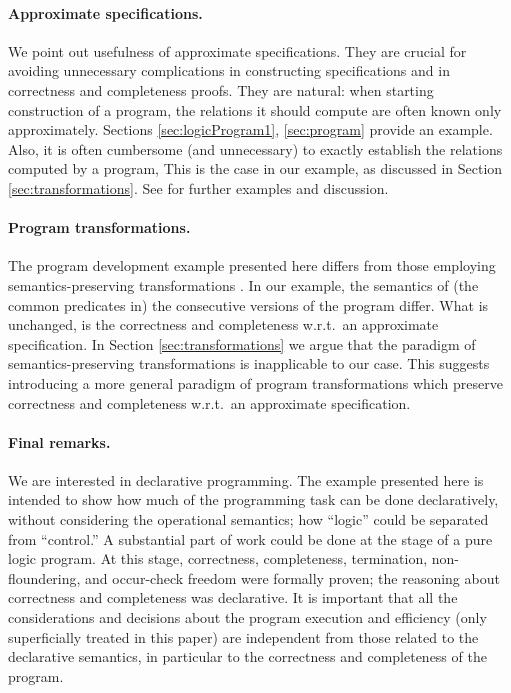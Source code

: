 \documentclass{tlp}
\begin{document}
\paragraph{Approximate specifications.}
  We point out usefulness of approximate specifications.
They are crucial for avoiding unnecessary
  complications in constructing specifications and in
   correctness and completeness proofs.
  They are natural:  when starting construction of a program, 
  the relations it should compute are often known only approximately.
  Sections \ref{sec:logicProgram1}, \ref{sec:program} provide an example.
Also, it is often cumbersome (and unnecessary) to exactly establish the
  relations computed by a program, 
  This is the case in our example, as discussed in Section
  \ref{sec:transformations}. 
  See \cite{drabent.tocl16} for further examples and discussion.
  

\paragraph{Program transformations.}
The program development example presented here differs from those
employing semantics-preserving transformations
\cite[and the references therein]{PettorossiPS10shorter}.
In our example,
  the semantics of (the common predicates in) the consecutive versions 
of the program differ.  What is unchanged, is the correctness
  and completeness w.r.t.\ an approximate specification.
In Section \ref{sec:transformations}
  we argue that the paradigm of semantics-preserving transformations
  is inapplicable to our case.
  This suggests introducing a more general paradigm of program transformations which 
  preserve correctness and completeness w.r.t.\ an approximate specification.




\paragraph{Final remarks.}
We are interested in declarative programming.
The example presented here
  is intended to show how much of the programming task can be
  done declaratively, 
  without considering the operational semantics; how 
   ``logic'' could be separated from ``control.''  A substantial part of work
  could be done at the stage of a pure logic program.
At this stage, correctness, completeness, termination, non-floundering, and
  occur-check freedom were formally proven;
the reasoning about correctness and completeness was declarative.
  It is important that all the
  considerations and decisions about the program execution and efficiency
  (only superficially treated in this paper) are independent from those related
  to the declarative semantics,
  in particular to the correctness and completeness of the program.
\end{document}
